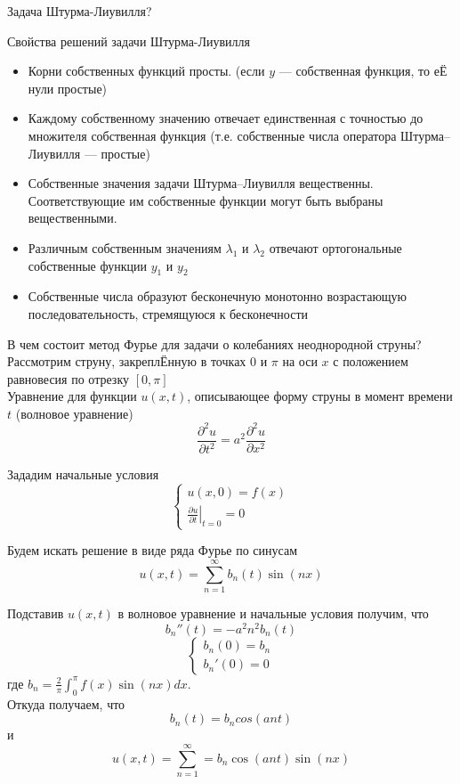 \documentclass{article}
\begin{document}
\begin{section}{Задача Штурма-Лиувилля?}
\begin{subsection}
Свойства решений задачи Штурма-Лиувилля
\begin{itemize}
	\item
	Корни собственных функций просты. (если $y$ --- собственная функция, то еЁ нули простые)
	\item
	Каждому собственному значению отвечает единственная с точностью до множителя собственная функция (т.е. собственные числа оператора Штурма–Лиувилля --- простые)
	\item
	Собственные значения задачи Штурма–Лиувилля вещественны. Соответствующие им собственные функции могут быть выбраны вещественными.
	\item
	Различным собственным значениям $ \lambda_1 $ и $ \lambda_2 $ отвечают ортогональные собственные функции $ y_1 $ и $ y_2 $
	\item
	Собственные числа образуют бесконечную монотонно возрастающую последовательность, стремящуюся к бесконечности
\end{itemize}
\end{subsection}

\begin{subsection}{В чем состоит метод Фурье для задачи о колебаниях неоднородной струны?}
Рассмотрим струну, закреплЁнную в точках $ 0 $ и $ \pi $ на оси $ x $ с положением равновесия по отрезку $ [0, \pi] $\\
Уравнение для функции $ u(x, t) $, описывающее форму струны в момент времени $ t $ (волновое уравнение)
\[ \frac{\partial^2u}{\partial t^2} = a^2 \frac{\partial^2u}{\partial x^2}\]

Зададим начальные условия 
\[ \left\{\begin{matrix}
	u(x, 0) = f(x)\\ 
	\left. \frac{\partial u}{\partial t} \right| _{t=0} = 0
\end{matrix}\right. \]

Будем искать решение в виде ряда Фурье по синусам
\[ u(x, t) = \sum_{n=1}^{\infty} b_n(t)\sin(nx) \]

Подставив $ u(x, t) $ в волновое уравнение и начальные условия получим, что
\[ b_n '' (t) = -a^2 n^2 b_n(t) \]
\[ \left\{\begin{matrix}
	b_n(0) = b_n\\ 
	b_n'(0) = 0
\end{matrix}\right. \]
где $b_n = \frac{2}{\pi} \int_{0}^{\pi}f(x) \sin(nx)dx$.\\
Откуда получаем, что
\[ b_n(t)=b_n cos(ant) \]
и 
\[ u(x, t) = \sum_{n=1}^{\infty} =b_n \cos(ant)\sin(nx) \]


\end{subsection}
\end{section}
\end{document}
